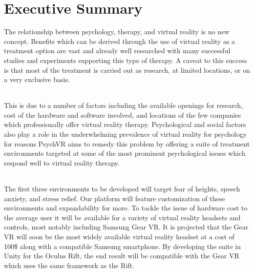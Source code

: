 \documentclass[a4paper,10pt]{article}
\begin{document}
\section{Executive Summary}
The relationship between psychology, therapy, and virtual reality is no new concept. Benefits which can be derived through the use of virtual reality as a treatment option are vast 
and already well researched with many successful studies and experiments supporting this type of therapy. A caveat to this success is that most of the treatment is carried out as research, 
at limited locations, or on a very exclusive basis.
\par~\\ 
This is due to a number of factors including the available openings for research, cost of the hardware and software involved, and locations
of the few companies which professionally offer virtual reality therapy. Psychological and social factors also play a role in the underwhelming prevalence of virtual reality for psychology for 
reasons PsychVR aims to remedy this problem by offering a suite of treatment environments targeted at some of the most prominent psychological issues which respond well to virtual reality therapy.
\par ~\\
The first three environments to be developed will target fear of heights, speech anxiety, and stress relief. Our platform will feature customization of these environments and expandability for more.
To tackle the issue of hardware cost to the average user it will be available for a variety of virtual reality headsets and controls, most notably including Samsung Gear VR. It is projected that the 
Gear VR will soon be the most widely available virtual reality headset at a cost of 100\$ along with a compatible Samsung smartphone. By developing the suite in Unity for the Oculus Rift, the end result
will be compatible with the Gear VR which uses the same framework as the Rift.
\pagebreak
\end{document}
